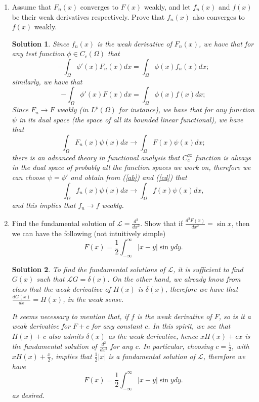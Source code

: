 \documentclass[6pt]{article}
\newtheorem{solution}{Solution}
\numberwithin{equation}{section}
\begin{document}
\begin{enumerate}
\item  Assume that $F_n(x)$ converges to $F(x)$ weakly, and let $f_n(x)$ and $f(x)$ be their weak derivatives respectively.  Prove that $f_n(x)$ also converges to $f(x)$ weakly.
\begin{solution}
Since $f_n(x)$ is the weak derivative of $F_n(x)$, we have that for any test function $\phi\in C_c(\Omega)$ that
\begin{equation}\label{ab}
-\int_\Omega \phi'(x)F_n(x)dx=\int_\Omega \phi(x)f_n(x)dx;
\end{equation}
similarly, we have that
\begin{equation}\label{cd}
-\int_\Omega \phi'(x)F(x)dx=\int_\Omega \phi(x)f(x)dx;
\end{equation}
Since $F_n\rightarrow F$ weakly (in $L^p(\Omega)$ for instance), we have that for any function $\psi$ in its dual space (the space of all its bounded linear functional), we have that
\[\int_\Omega F_n(x) \psi(x)dx \rightarrow \int_\Omega F(x) \psi(x) dx;\]
there is an advanced theory in functional analysis that $C_c^\infty$ function is always in the dual space of probably all the function spaces we work on, therefore we can choose $\psi=\phi'$ and obtain from (\ref{ab}) and (\ref{cd}) that
\[\int_\Omega f_n(x) \psi(x)dx \rightarrow \int_\Omega f(x) \psi(x) dx,\]
and this implies that $f_n\rightarrow f$ weakly.
\end{solution}

\item Find the fundamental solution of $\mathcal L=\frac{d^2}{dx^2}$.  Show that if $\frac{d^2F(x)}{dx^2}=\sin x$, then we can have the following (not intuitively simple)
\[F(x)=\frac{1}{2}\int_{-\infty}^\infty |x-y|\sin ydy.\]
\begin{solution}
To find the fundamental solutions of $\mathcal L$, it is sufficient to find $G(x)$ such that $\mathcal L G=\delta(x)$.  On the other hand, we already know from class that the weak derivative of $H(x)$ is $\delta(x)$, therefore we have that $\frac{dG(x)}{dx}=H(x)$, in the weak sense.

It seems necessary to mention that, if $f$ is the weak derivative of $F$, so is it a weak derivative for $F+c$ for any constant $c$.  In this spirit, we see that $H(x)+c$ also admits $\delta(x)$ as the weak derivative, hence $xH(x)+cx$ is the fundamental solution of $\frac{d^2}{dx^2}$ for any $c$.  In particular, choosing $c=\frac{1}{2}$, with $xH(x)+\frac{x}{2}$, implies that $\frac{1}{2}|x|$ is a fundamental solution of $\mathcal L$, therefore we have
\[F(x)=\frac{1}{2}\int_{-\infty}^\infty |x-y|\sin ydy.\]
as desired.


\end{solution}
\end{enumerate}
\end{document}
